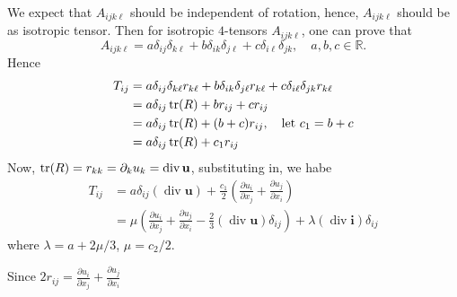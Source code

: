 We expect that $A_{ijk\ell}$ should be independent of rotation, hence, $A_{ijk\ell}$ should be as isotropic tensor. Then for isotropic $4$-tensors $A_{ijk\ell}$, one can prove that 
\begin{equation}
A_{ijk\ell} = a \delta_{ij}\delta_{k\ell}+ b \delta_{ik}\delta_{j\ell}+ c \delta_{i\ell}\delta_{jk},\quad a,b,c\in\mathbb{R}.
\end{equation}
Hence 
\begin{equation}
\begin{aligned}
T_{ij}
&= a \delta_{ij}\delta_{k\ell} r_{k\ell}
+ b \delta_{ik}\delta_{j\ell} r_{k\ell}
+ c \delta_{i\ell}\delta_{jk} r_{k\ell}\\
&= a\delta_{ij}\tr(R) + br_{ij}+cr_{ij}\\
&= a\delta_{ij}\tr(R) + (b+c)r_{ij},\quad\text{let $c_{1} = b+c$}\\
&= a\delta_{ij}\tr(R) + c_{1}r_{ij}
\end{aligned}
\end{equation}
Now, $\tr(R) = r_{kk} = \partial_{k}u_{k} = \operatorname{div}\textbf{u}$, substituting in, we habe
\begin{equation}
\begin{aligned}
T_{ij} &= a\delta_{ij}(\operatorname{div}\textbf{u}) + \frac{c_{1}}{2}
\left(\frac{\partial u_{i}}{\partial x_{j}} + \frac{\partial u_{j}}{\partial x_{i}}\right)\\
&= \mu \left(\frac{\partial u_{i}}{\partial x_{j}} + \frac{\partial u_{j}}{\partial x_{i}} - \frac{2}{3}(\operatorname{div}\textbf{u})\delta_{ij}\right) + \lambda (\operatorname{div}\textbf{i})\delta_{ij}
\end{aligned}
\end{equation}
where $\lambda = a + 2\mu/3$, $\mu = c_2/2$.

Since $\displaystyle 2r_{ij} = \frac{\partial u_{i}}{\partial x_{j}} + \frac{\partial u_{j}}{\partial x_{i}}$​

